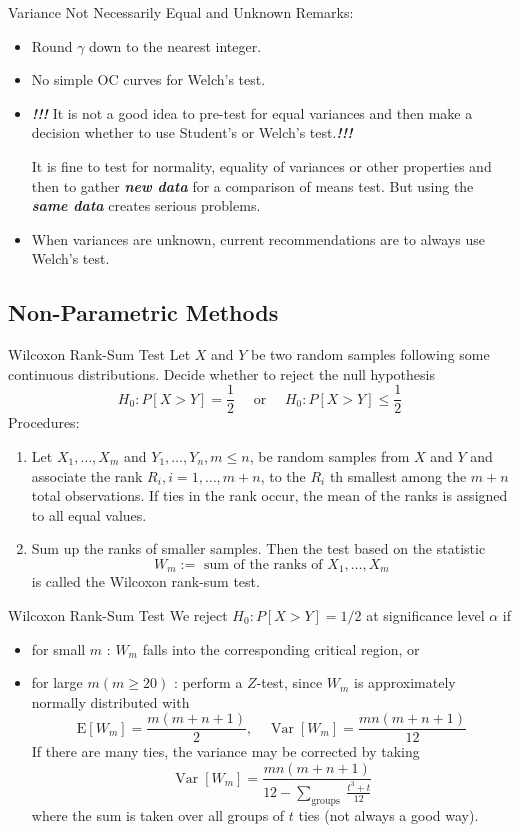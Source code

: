 \documentclass{beamer}
\newcommand{\bb}[1]{\textcolor{antiquefuchsia}{\textbf{\textit{#1}}}}
\begin{document}
\begin{frame}{Variance Not Necessarily Equal and Unknown}
Remarks:
\begin{itemize}
\item Round $\gamma$ down to the nearest integer.
\item No simple OC curves for Welch's test.
\item \bb{!!!} It is not a good idea to pre-test for equal variances and then make a decision whether to use Student's or Welch's test.\bb{!!!}

It is fine to test for normality, equality of variances or other properties and then to gather \bb{new data} for a comparison of means test. But using the \bb{same data} creates serious problems.
\item When variances are unknown, current recommendations are to always use Welch's test.
\end{itemize}
\end{frame}

\subsection{Non-Parametric Methods}
\begin{frame}{Wilcoxon Rank-Sum Test}
Let $X$ and $Y$ be two random samples following some continuous distributions.
Decide whether to reject the null hypothesis
$$
H_{0}: P[X>Y]=\frac{1}{2} \quad \text { or } \quad H_{0}: P[X>Y] \leq \frac{1}{2}
$$
Procedures:
\begin{enumerate}
\item Let $X_{1}, \ldots, X_{m}$ and $Y_{1}, \ldots, Y_{n}, m \leq n$, be random samples from $X$ and $Y$ and associate the rank $R_{i}, i=1, \ldots, m+n$, to the $R_{i}$ th smallest among the $m+n$ total observations. If ties in the rank occur, the mean of the ranks is assigned to all equal values.
\item Sum up the ranks of smaller samples. Then the test based on the statistic
$$
W_{m}:=\text { sum of the ranks of } X_{1}, \ldots, X_{m}
$$
is called the Wilcoxon rank-sum test.
\end{enumerate}
\end{frame}

\begin{frame}{Wilcoxon Rank-Sum Test}
We reject $H_{0}: P[X>Y]=1 / 2$ at significance level $\alpha$ if
\begin{itemize}
\item for small $m$ : $W_{m}$ falls into the corresponding critical region, or
\item for large $m(m \geq 20)$ : perform a $Z$-test, since $W_{m}$ is approximately normally distributed with
$$
\mathrm{E}\left[W_{m}\right]=\frac{m(m+n+1)}{2}, \quad \operatorname{Var}\left[W_{m}\right]=\frac{m n(m+n+1)}{12}
$$
If there are many ties, the variance may be corrected by taking
$$
\operatorname{Var}\left[W_{m}\right]=\frac{m n(m+n+1)}{12-\sum_{\text {groups }} \frac{t^{3}+t}{12}}
$$
where the sum is taken over all groups of $t$ ties (not always a good way).
\end{itemize}
\end{frame}
\end{document}

